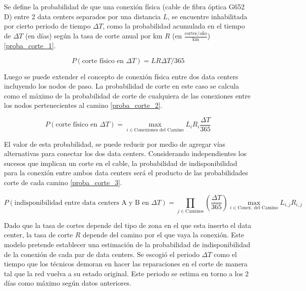 Se define la probabilidad de que una conexión física (cable de fibra óptica G652 D) entre 2 data centers separados por una distancia $L$, se encuentre inhabilitada por cierto periodo de tiempo $\Delta T$, como la probabilidad acumulada en el tiempo de $\Delta T$ (en días) según la tasa de corte anual por km $R$ (en $\frac{\text{cortes}/\text{año}}{\text{km}}$) \eqref{proba_corte_1}.

\begin{equation}
\label{proba_corte_1}
P(\text{corte físico en }\Delta T) = L R \Delta T /365
\end{equation}

Luego se puede extender el concepto de conexión física entre dos data centers incluyendo los nodos de paso. La probabilidad de corte en este caso se calcula como el máximo de la probabilidad de corte de cualquiera de las conexiones entre los nodos pertenecientes al camino \eqref{proba_corte_2}.

\begin{equation}
\label{proba_corte_2}
P(\text{corte físico en }\Delta T) = \max_{i \in \text{Conexiones del Camino}} {L_i R_i \frac{\Delta T}{ 365}}
\end{equation}

El valor de esta probabilidad, se puede reducir por medio de agregar vías alternativas para conectar los dos data centers. Considerando independientes los sucesos que implican un corte en el cable, la probabilidad de indisponibilidad para la conexión entre ambos data centers será el producto de las probabilidades corte de cada camino \eqref{proba_corte_3}.

\begin{equation}
\label{proba_corte_3}
P(\text{indisponibilidad entre data centers A y B en }\Delta T) =  \prod_{j \in \text{Caminos}}\left( \frac{\Delta T}{365}\right) \max_{i \in \text{Conex. del Camino}} {L_{i,j} R_{i,j} }
\end{equation}

Dado que la tasa de cortes depende del tipo de zona en el que esta inserto el data center, la tasa de corte $R$ depende del camino por el que vaya la conexión. Este modelo pretende establecer una estimación de la probabilidad de indisponibilidad de la conexión de cada par de data centers. Se escogió el periodo $\Delta T$ como el tiempo que los técnicos demoran en hacer las reparaciones en el corte de manera tal que la red vuelva a su estado original. Este periodo se estima en torno a los 2 días como máximo según datos anteriores.

